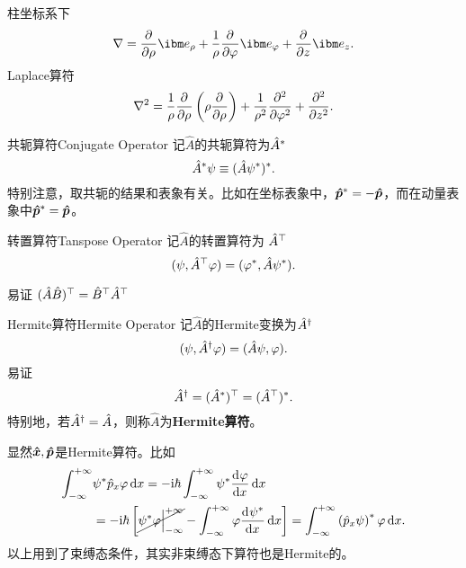 	柱坐标系下
	\[
		\nabla=\pp\rho\ibm e_\rho+\frac1\rho\pp\varphi\ibm e_\varphi+\pp z\ibm e_z.
	\]
	Laplace算符
	\[
		\nabla^2=\frac1\rho\pp\rho\kh{\rho\pp\rho}+\frac1{\rho^2}\pp[2]\varphi+\pp[2]z.
	\]
\fi
\begin{definition}{共轭算符}{Conjugate Operator}
	记$\hat A$的共轭算符为$\hat A\cj$
	\[
		\hat A\cj\psi\equiv(\hat A\psi\cj)\cj.
	\]
	特别注意，取共轭的结果和表象有关。比如在坐标表象中，$\qo p\cj=-\qo p$，而在动量表象中$\qo p\cj=\qo p$。
\end{definition}
\begin{definition}{转置算符}{Tanspose Operator}
	记$\hat A$的转置算符为
	$\hat A\tp$
	\[
		(\psi,\hat A\tp\varphi)=(\varphi\cj,\hat A\psi\cj).
	\]
\end{definition}
易证
\((\hat A\hat B)\tp=\hat B\tp\hat A\tp\)
\begin{definition}{Hermite算符}{Hermite Operator}
	记$\hat A$的Hermite变换为$\hat A\dg$
	\[
		(\psi,\hat A\dg\varphi)=(\hat A\psi,\varphi).
	\]
	易证
	\[
		\hat A\dg=(\hat A\cj)\tp=(\hat A\tp)\cj.
	\]
	特别地，若$\hat A\dg=\hat A$，则称$\hat A$为\textbf{Hermite算符}。
\end{definition}
显然$\qo x,\qo p$是Hermite算符。比如
\begin{align*}
	\int\iti & \psi\cj\hat p_x\varphi\d x=-\i\hbar\int\iti\psi\cj\dv\varphi{x}\d x                                                                     \\
	         & =-\i\hbar\left[\cancel{\psi\cj\varphi{\Big\vert}\iti}-\int\iti\varphi\dv{\psi\cj}x\d x\right]=\int\iti\kh{\hat p_x\psi}\cj\varphi\d x.
\end{align*}
以上用到了束缚态条件，其实非束缚态下算符也是Hermite的。
